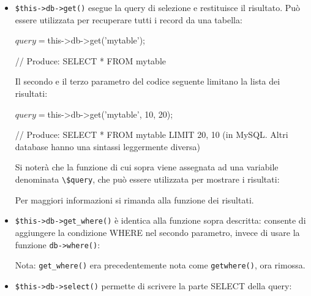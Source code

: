 \begin{itemize}

\item \verb|$this->db->get()| esegue la query di selezione e restituisce il risultato. Può essere utilizzata per recuperare tutti i record da una tabella:

\begin{code}
$query = $this->db->get('mytable');

// Produce: SELECT * FROM mytable
\end{code}

Il secondo e il terzo parametro del codice seguente limitano la lista dei risultati:

\begin{code}
$query = $this->db->get('mytable', 10, 20);

// Produce: SELECT * FROM mytable LIMIT 20, 10 (in MySQL. Altri database hanno una sintassi leggermente diversa)
\end{code}

Si noterà che la funzione di cui sopra viene assegnata ad una variabile denominata \verb|\$query|, che può essere utilizzata per mostrare i risultati:


Per maggiori informazioni si rimanda alla funzione dei risultati.

\item \verb|$this->db->get_where()| è identica alla funzione sopra descritta: consente di aggiungere la condizione WHERE nel secondo parametro, invece di usare la funzione \verb|db->where()|:


Nota: \verb|get_where()| era precedentemente nota come \verb|getwhere()|, ora rimossa.

\item \verb|$this->db->select()| permette di scrivere la parte SELECT della query:

\end{itemize}
